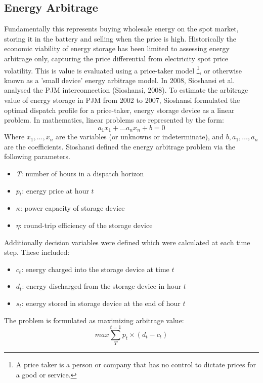 \subsection{ Energy Arbitrage }
 Fundamentally this represents buying wholesale energy on the spot market, storing it in the battery and selling when the price is high. Historically the economic viability of energy storage has been limited to assessing energy arbitrage only, capturing the price differential from electricity spot price volatility. This is value is evaluated using a price-taker model \footnote{A price taker is a person or company that has no control to dictate prices for a good or service.}, or otherwise known as a 'small device' energy arbitrage model. In 2008, Sioshansi et al. analysed the PJM interconnection (Sioshansi, 2008). To estimate the arbitrage value of energy storage in PJM from 2002 to 2007, Sioshansi formulated the optimal dispatch profile for a price-taker, energy storage device as a linear problem. In mathematics, linear problems are represented by the form: 
\begin{equation}
    a_1 x_1 + ... a_n x_n + b = 0
\end{equation}
Where ${\displaystyle x_{1},\ldots ,x_{n}}$ are the variables (or unknowns or indeterminate), and ${\displaystyle b, a_{1},\ldots ,a_{n}}$ are the coefficients. Sioshansi defined the energy arbitrage problem via the following parameters. 
\begin{itemize}
    \item \textit{T}: number of hours in a dispatch horizon
    \item \textit{$p_t$}: energy price at hour $t$ 
    \item $\kappa$: power capacity of storage device
    \item $\eta$: round-trip efficiency of the storage device 
\end{itemize}
Additionally decision variables were defined which were calculated at each time step. These included: 
\begin{itemize}
    \item $c_t$: energy charged into the storage device at time $t$
    \item $d_t$: energy discharged from the storage device in hour $t$
    \item $s_t$: energy stored in storage device at the end of hour $t$
\end{itemize}
The problem is formulated as maximizing arbitrage value:
\begin{equation}
    max \sum_{T}^{t=1}p_t \times (d_t - c_t)
\end{equation}
